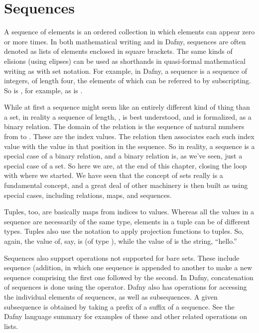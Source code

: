 \documentclass[letterpaper,10pt,english]{sphinxmanual}
\begin{document}
\section{Sequences}
\label{\detokenize{08-relations:sequences}}
A sequence of elements is an ordered collection in which elements can
appear zero or more times. In both mathematical writing and in Dafny,
sequences are often denoted as lists of elements enclosed in square
brackets.  The same kinds of elisions (using elipses) can be used as
shorthands in quasi-formal mathematical writing as with set notation.
For example, in Dafny, a sequence  is a sequence of
integers, of length four, the elements of which can be referred to by
subscripting. So  is , for example, as is .

While at first a sequence might seem like an entirely different kind
of thing than a set, in reality a sequence of length, , is best
understood, and is formalized, as a binary relation. The domain of the
relation is the sequence of natural numbers from  to .  These
are the index values. The relation then associates each such index
value with the value in that position in the sequence. So in reality,
a sequence is a special case of a binary relation, and a binary
relation is, as we’ve seen, just a special case of a set.  So here we
are, at the end of this chapter, closing the loop with where we
started. We have seen that the concept of sets really is a fundamental
concept, and a great deal of other machinery is then built as using
special cases, including relations, maps, and sequences.

Tuples, too, are basically maps from indices to values. Whereas all
the values in a sequence are necessarily of the same type, elements in
a tuple can be of different types. Tuples also use the  notation
to apply projection functions to tuples. So, again, the value of, say,
 is  (of type ), while the value of
 is the string, “hello.”

Sequences also support operations not supported for bare sets. These
include sequence  (addition, in which one sequence is
appended to another to make a new sequence comprising the first one
followed by the second. In Dafny, concatenation of sequences is done
using the \sphinxstyleemphasis{+} operator. Dafny also has operations for accessing the
individual elements of sequences, as well as subsequences. A given
subsequence is obtained by taking a prefix of a suffix of a sequence.
See the Dafny language summary for examples of these and other related
operations on lists.
\end{document}
